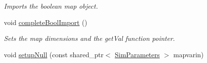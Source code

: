 \begin{DoxyCompactItemize}
\begin{DoxyCompactList}\small\item\em Imports the boolean map object. \end{DoxyCompactList}\item 
void \hyperlink{class_data_mask_a09a24a15ad49851e8f344150a9109dd2}{complete\+Bool\+Import} ()\hypertarget{class_data_mask_a09a24a15ad49851e8f344150a9109dd2}{}\label{class_data_mask_a09a24a15ad49851e8f344150a9109dd2}

\begin{DoxyCompactList}\small\item\em Sets the map dimensions and the get\+Val function pointer. \end{DoxyCompactList}\item 
void \hyperlink{class_data_mask_af132f464ffb320233a866f46dfe7b87d}{setup\+Null} (const shared\+\_\+ptr$<$ \hyperlink{struct_sim_parameters}{Sim\+Parameters} $>$ mapvarin)\hypertarget{class_data_mask_af132f464ffb320233a866f46dfe7b87d}{}\label{class_data_mask_af132f464ffb320233a866f46dfe7b87d}


\end{DoxyCompactItemize}
